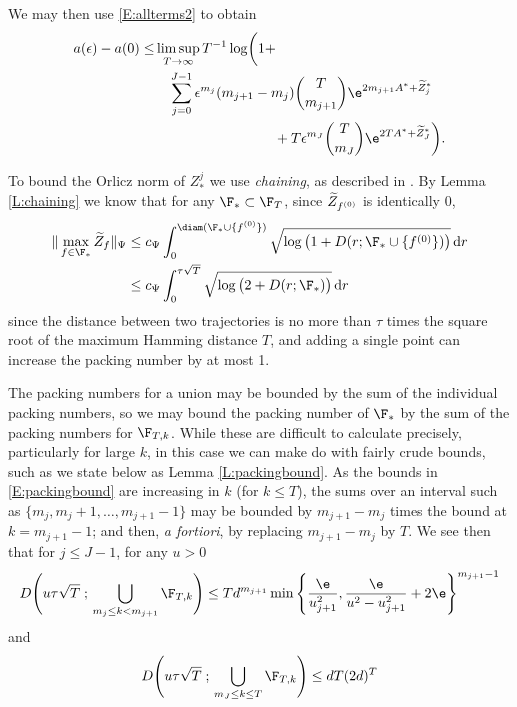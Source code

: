 \documentclass[11pt]{amsart}
\begin{document}
We may then use \eqref{E:allterms2} to obtain
\begin{equation}  \label{E:Ynbound1}
\begin{split}
a(\epsilon)-a(0) \le 
  &\limsup_{T\to\infty} T^{-1}\log \biggl( 1+\\
  &\quad \sum_{j=0}^{J-1} \epsilon^{m_{j}} (m_{j+1}-m_{j})\binom{T}{m_{j+1}} \e^{2m_{j+1} A^* + \tZ^*_{j}} \\ &\hspace*{3cm}+T\epsilon^{m_{J}} \binom{T}{m_{J}} \e^{2T A^* + \tZ^*_{J}} \biggr) .
\end{split}
\end{equation}

To bound the Orlicz norm of $Z_{*}^{j}$ we use {\em chaining}, as described in
\cite{dP90}. By Lemma \ref{L:chaining} we know that for any $\F_{*}\subset \F_T$,
since $\widetilde{Z}_{f^{(0)}}$ is identically 0,
\begin{equation}  \label{E:Zstarorlicz}
	\begin{split}
		\|\max_{f\in\F_{*}}\tZ_{f}\|_{\Psi} &\le c_\Psi \int_0^{\diam(\F_*\cup \{f^{(0)}\})} 
		\sqrt{ \log \left(1+ D(r ; \F_*\cup \{f^{(0)}\}) \right) } \dif r \\
		&\le c_\Psi \int_0^{\tau\sqrt{T}} 
		\sqrt{ \log \left(2+ D(r ; \F_*) \right) } \dif r 
	\end{split}
\end{equation}
since the distance between two trajectories is no more than $\tau$ times the square root of the maximum Hamming distance $T$, and adding a single point can increase the packing number by at most 1.

The packing numbers for a union may be bounded by the sum of the individual packing numbers, so we may bound the packing number of $\F_*$ by the sum of the packing numbers for $\F_{T,k}$.
While these are difficult to calculate precisely, particularly for large $k$, in this case we can make do with fairly crude bounds, such as we state below as Lemma \ref{L:packingbound}. 
As the bounds in \eqref{E:packingbound} are increasing in $k$ (for $k\le T$), the sums over an interval such as $\{m_j,m_j+1,\dots, m_{j+1}-1\}$ may be bounded by $m_{j+1}-m_j$ times the bound at $k=m_{j+1}-1$; and then, {\em a fortiori}, by replacing $m_{j+1}-m_j$ by $T$.
We see then that for $j\le J-1$, for any $u>0$
$$
D\Biggl( u\tau\sqrt{T} \; ;\,\bigcup_{m_{j}\le  k < m_{j+1}}\F_{T,k} \Biggr)\le 
T d^{m_{j+1}}\min\left\{ \frac{\e}{u_{j+1}^2}, \frac{\e}{u^2-u_{j+1}^2}+2\e \right\}^{m_{j+1}-1}
$$
and
$$
D\Biggl( u\tau \sqrt{T} \; ;\, \bigcup_{m_{J}\le k\le T}\F_{T,k} \Biggr)\le 
dT (2 d )^{T}
$$
\end{document}
